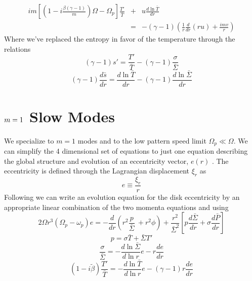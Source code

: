 \documentclass[apj]{emulateapj}
\begin{document}
\begin{eqnarray}  \label{eq:dtT}
i m \left[ \left( 1 - i \frac{\beta(\gamma -1)}{m} \right) \Omega - \Omega_p \right] \frac{T'}{\bar{T} } &+& u \frac{d  \ln \bar{T}}{d r}   \\ 
&=& -(\gamma -1)  \left( \frac{1}{r} \frac{d }{d r} ( r u) + \frac{ i m v}{r } \right) \nonumber
\end{eqnarray}
Where we've replaced the entropy in favor of the temperature through the relations
\begin{equation}
(\gamma -1)s' = \frac{ T'}{ \bar{T}} - (\gamma -1 ) \frac{ \sigma}{ \bar{\Sigma}} 
\end{equation}
\begin{equation}
(\gamma -1)\frac{d \bar{s}}{d r} = \frac{d \ln \bar{T}}{d r} - (\gamma -1) \frac{ d \ln \bar{\Sigma}}{d r} 
\end{equation}


\section{ $\MakeLowercase{m}=1$ Slow Modes }
We specialize to $m=1$ modes and to the low pattern speed limit $\Omega_p \ll \Omega$. We can simplify the 4 dimensional set of equations to just one equation describing the global structure and evolution of an eccentricity vector, $e(r)$ \citep{og01,go06,papa02}. The eccentricity is defined through the Lagrangian displacement $\xi_r$ as 
\begin{equation}
e \equiv \frac{ \xi_r} {r} 
\end{equation}
 Following \cite{papa02} we can write an evolution equation for the disk eccentricity by an appropriate linear combination of the two momenta equations and using 
 \begin{equation}
2 \Omega r^3 ( \Omega_p - \omega_p) e = - \frac{d }{dr} \left( r^2 \frac{p}{\bar{\Sigma}} \ + r^2 \phi \right) + \frac{r^2}{\bar{\Sigma}^2} \left[ p \frac{d \bar{\Sigma}}{d r} + \sigma \frac{ d \bar{P}}{d r} \right]
\end{equation}
 \begin{equation}
p = \sigma \bar{T} + \bar{\Sigma} T'
\end{equation}
 \begin{equation}
\frac{\sigma}{\bar{\Sigma}} = - \frac{d \ln \bar{\Sigma}}{ d \ln r} e - r \frac{d e}{d r} 
\end{equation}
\begin{equation}
(1- i\tilde{\beta}) \frac{T'}{\bar{T}} = -\frac{d \ln \bar{T}}{d \ln r} e - (\gamma -1) r \frac{d e}{d r}
\end{equation}
\end{document}
